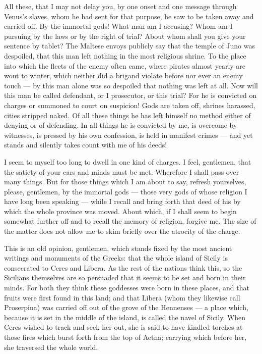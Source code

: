  All these, that I may not delay you, by one onset and one message through Venus's slaves, whom he had sent for that purpose, he saw to be taken away and carried off. By the immortal gods! What man am I accusing? Whom am I pursuing by the laws or by the right of trial? About whom shall you give your sentence by tablet? The Maltese envoys publicly say that the temple of Juno was despoiled, that this man left nothing in the most religious shrine. To the place into which the fleets of the enemy often came, where pirates almost yearly are wont to winter, which neither did a brigand violate before nor ever an enemy touch --- by this man alone was so despoiled that nothing was left at all. Now will this man be called defendant, or I prosecutor, or this trial? For he is convicted on charges or summoned to court on suspicion! Gods are taken off, shrines harassed, cities stripped naked. Of all these things he has left himself no method either of denying or of defending. In all things he is convicted by me, is overcome by witnesses, is pressed by his own confession, is held in manifest crimes --- and yet stands and silently takes count with me of his deeds!

 I seem to myself too long to dwell in one kind of charges. I feel, gentlemen, that the satiety of your ears and minds must be met. Wherefore I shall pass over many things. But for those things which I am about to say, refresh yourselves, please, gentlemen, by the immortal gods --- those very gods of whose religion I have long been speaking --- while I recall and bring forth that deed of his by which the whole province was moved. About which, if I shall seem to begin somewhat further off and to recall the memory of religion, forgive me. The size of the matter does not allow me to skim briefly over the atrocity of the charge.

 This is an old opinion, gentlemen, which stands fixed by the most ancient writings and monuments of the Greeks: that the whole island of Sicily is consecrated to Ceres and Libera. As the rest of the nations think this, so the Sicilians themselves are so persuaded that it seems to be set and born in their minds. For both they think these goddesses were born in these places, and that fruits were first found in this land; and that Libera (whom they likewise call Proserpina) was carried off out of the grove of the Hennenses --- a place which, because it is set in the middle of the island, is called the navel of Sicily. When Ceres wished to track and seek her out, she is said to have kindled torches at those fires which burst forth from the top of Aetna; carrying which before her, she traversed the whole world.

